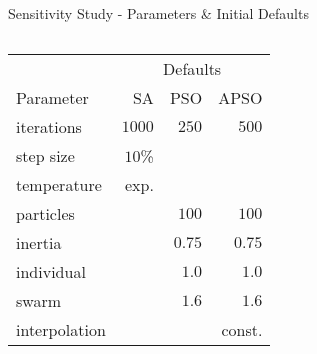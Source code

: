\documentclass[11pt,aspectratio=169]{beamer}
\begin{document}
\begin{frame}[fragile]{Sensitivity Study - Parameters \& Initial Defaults}
\begin{columns}
    \begin{column}{0.5\textwidth}
        \begin{center}
            \begin{tabular}{@{}lrrr@{}}
                \toprule
                & \multicolumn{3}{c}{Defaults}       \\
                \cmidrule(r){2-4}Parameter & SA & PSO & APSO\\
                \midrule
                iterations    & $1000$ &  $250$ &  $500$ \\
                step size     & $10$\% &        &        \\
                temperature   &   exp. &        &        \\
                particles     &        &  $100$ &  $100$ \\
                inertia       &        & $0.75$ & $0.75$ \\
                individual    &        &  $1.0$ &  $1.0$ \\
                swarm         &        &  $1.6$ &  $1.6$ \\
                interpolation &        &        & const. \\
                \bottomrule
            \end{tabular}
        \end{center}
    \end{column}
    \end{columns}

\end{frame}

%
%
\end{document}
